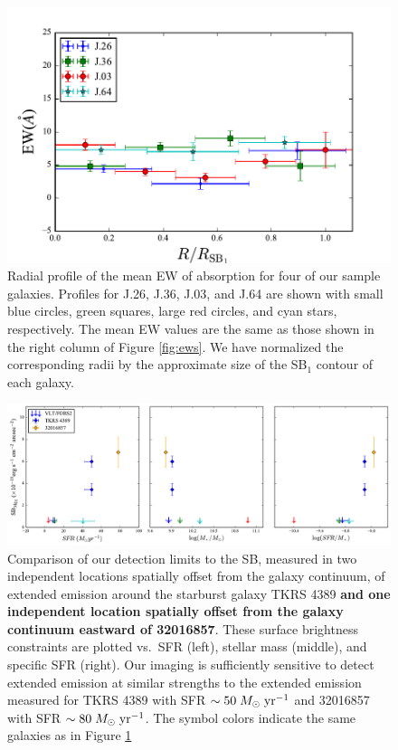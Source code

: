 \documentclass[trackchanges,twocolumn]{aastex62}
\def \msunperyr {{\; M_{\odot}\rm \;yr^{-1}}}
\begin{document}
\begin{figure}[!htb]
\centering
\includegraphics[scale=0.7]{figure10.pdf}%
\caption{Radial profile of the mean EW of  absorption for four of our sample galaxies. Profiles for J.26,  J.36,  J.03, and J.64 are shown with small blue circles, green squares, large red circles, and cyan stars, respectively. The mean EW values are the same as those shown in the right column of Figure \ref{fig:ews}. We have normalized the corresponding radii by the approximate size of the SB$_1$ contour of each galaxy.}
\label{fig:ew_comb}
\end{figure}

\begin{figure}[!htb]
\centering
\includegraphics[scale=0.57]{figure11.pdf}%
\caption{Comparison of our detection limits to the SB, measured in two independent locations spatially offset from the galaxy continuum, of extended  emission around the starburst galaxy TKRS 4389 \textbf{and one independent location spatially offset from the galaxy continuum eastward of 32016857}. These surface brightness constraints are plotted vs.\ SFR (left), stellar mass (middle), and specific SFR (right). Our imaging is sufficiently sensitive to detect extended emission at similar strengths to the extended emission measured for TKRS 4389 with SFR $\sim 50 \msunperyr$ and 32016857 with SFR $\sim 80 \msunperyr$. The symbol colors indicate the same galaxies as in Figure \ref{fig:ew_comb}}
\label{fig:all_limits}
\end{figure}
\end{document}
